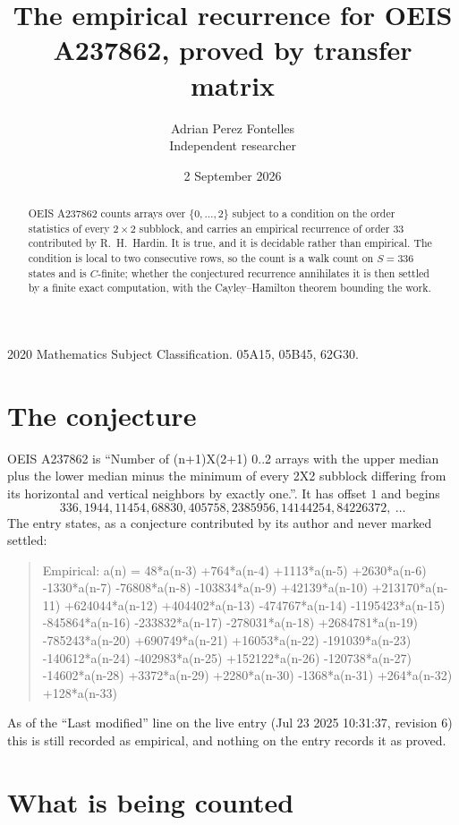 \documentclass[11pt,a4paper]{article}
\title{The empirical recurrence for OEIS A237862, proved by transfer matrix}
\author{Adrian Perez Fontelles\\ \small Independent researcher}
\date{2 September 2026}
\theoremstyle{plain}
\theoremstyle{definition}
\begin{document}
\maketitle

\begin{abstract}
OEIS A237862 counts arrays over $\{0,\dots,2\}$ subject to a condition on the order
statistics of every $2\times2$ subblock, and carries an empirical recurrence of order
$33$ contributed by R.~H.~Hardin. It is true, and it is decidable rather than empirical.
The condition is local to two consecutive rows, so the count is a walk count on $S=336$
states and is $C$-finite; whether the conjectured recurrence annihilates it is then settled by
a finite exact computation, with the Cayley--Hamilton theorem bounding the work.
\end{abstract}

\noindent\small 2020 Mathematics Subject Classification. 05A15, 05B45, 62G30.\normalsize

\section{The conjecture}

OEIS A237862 is ``Number of (n+1)X(2+1) 0..2 arrays with the upper median plus the lower median minus the minimum of every 2X2 subblock differing from its horizontal and vertical neighbors by exactly one.''. It has offset $1$ and begins
\[
336, 1944, 11454, 68830, 405758, 2385956, 14144254, 84226372,\ \dots
\]
The entry states, as a conjecture contributed by its author and never marked settled:
\begin{quote}
Empirical: a(n) = 48*a(n-3) +764*a(n-4) +1113*a(n-5) +2630*a(n-6) -1330*a(n-7) -76808*a(n-8) -103834*a(n-9) +42139*a(n-10) +213170*a(n-11) +624044*a(n-12) +404402*a(n-13) -474767*a(n-14) -1195423*a(n-15) -845864*a(n-16) -233832*a(n-17) -278031*a(n-18) +2684781*a(n-19) -785243*a(n-20) +690749*a(n-21) +16053*a(n-22) -191039*a(n-23) -140612*a(n-24) -402983*a(n-25) +152122*a(n-26) -120738*a(n-27) -14602*a(n-28) +3372*a(n-29) +2280*a(n-30) -1368*a(n-31) +264*a(n-32) +128*a(n-33)
\end{quote}
As of the ``Last modified'' line on the live entry (Jul 23 2025 10:31:37, revision 6) this is still
recorded as empirical, and nothing on the entry records it as proved.

\section{What is being counted}
\end{document}
